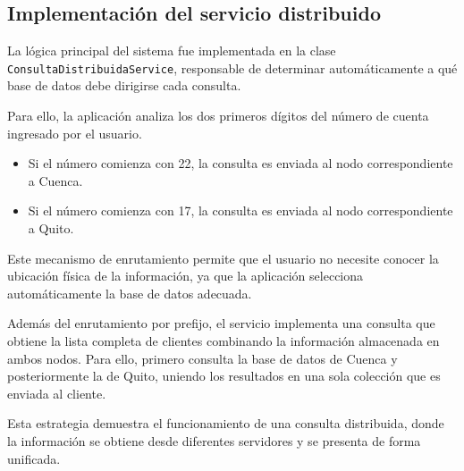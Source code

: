 \documentclass[11pt,a4paper]{article}
\begin{document}
\subsection{Implementación del servicio distribuido}

La lógica principal del sistema fue implementada en la clase \texttt{ConsultaDistribuidaService}, responsable de determinar automáticamente a qué base de datos debe dirigirse cada consulta.

Para ello, la aplicación analiza los dos primeros dígitos del número de cuenta ingresado por el usuario.

\begin{itemize}[leftmargin=*]
    \item Si el número comienza con 22, la consulta es enviada al nodo correspondiente a Cuenca.
    \item Si el número comienza con 17, la consulta es enviada al nodo correspondiente a Quito.
\end{itemize}

Este mecanismo de enrutamiento permite que el usuario no necesite conocer la ubicación física de la información, ya que la aplicación selecciona automáticamente la base de datos adecuada.

Además del enrutamiento por prefijo, el servicio implementa una consulta que obtiene la lista completa de clientes combinando la información almacenada en ambos nodos. Para ello, primero consulta la base de datos de Cuenca y posteriormente la de Quito, uniendo los resultados en una sola colección que es enviada al cliente.

Esta estrategia demuestra el funcionamiento de una consulta distribuida, donde la información se obtiene desde diferentes servidores y se presenta de forma unificada.
\end{document}
